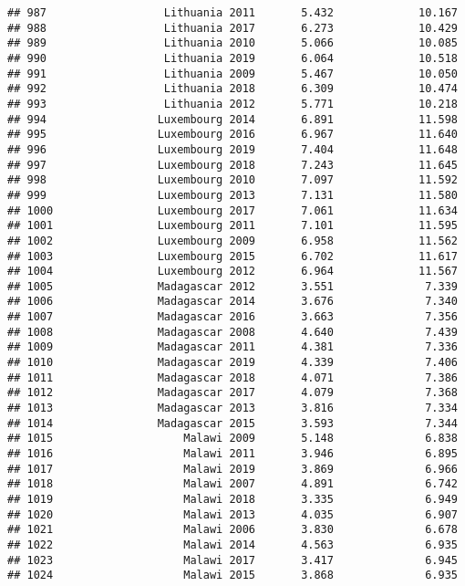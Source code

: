 \documentclass[
]{article}
\begin{document}
\begin{verbatim}
## 987                  Lithuania 2011       5.432             10.167
## 988                  Lithuania 2017       6.273             10.429
## 989                  Lithuania 2010       5.066             10.085
## 990                  Lithuania 2019       6.064             10.518
## 991                  Lithuania 2009       5.467             10.050
## 992                  Lithuania 2018       6.309             10.474
## 993                  Lithuania 2012       5.771             10.218
## 994                 Luxembourg 2014       6.891             11.598
## 995                 Luxembourg 2016       6.967             11.640
## 996                 Luxembourg 2019       7.404             11.648
## 997                 Luxembourg 2018       7.243             11.645
## 998                 Luxembourg 2010       7.097             11.592
## 999                 Luxembourg 2013       7.131             11.580
## 1000                Luxembourg 2017       7.061             11.634
## 1001                Luxembourg 2011       7.101             11.595
## 1002                Luxembourg 2009       6.958             11.562
## 1003                Luxembourg 2015       6.702             11.617
## 1004                Luxembourg 2012       6.964             11.567
## 1005                Madagascar 2012       3.551              7.339
## 1006                Madagascar 2014       3.676              7.340
## 1007                Madagascar 2016       3.663              7.356
## 1008                Madagascar 2008       4.640              7.439
## 1009                Madagascar 2011       4.381              7.336
## 1010                Madagascar 2019       4.339              7.406
## 1011                Madagascar 2018       4.071              7.386
## 1012                Madagascar 2017       4.079              7.368
## 1013                Madagascar 2013       3.816              7.334
## 1014                Madagascar 2015       3.593              7.344
## 1015                    Malawi 2009       5.148              6.838
## 1016                    Malawi 2011       3.946              6.895
## 1017                    Malawi 2019       3.869              6.966
## 1018                    Malawi 2007       4.891              6.742
## 1019                    Malawi 2018       3.335              6.949
## 1020                    Malawi 2013       4.035              6.907
## 1021                    Malawi 2006       3.830              6.678
## 1022                    Malawi 2014       4.563              6.935
## 1023                    Malawi 2017       3.417              6.945
## 1024                    Malawi 2015       3.868              6.935

\end{verbatim}
\end{document}
